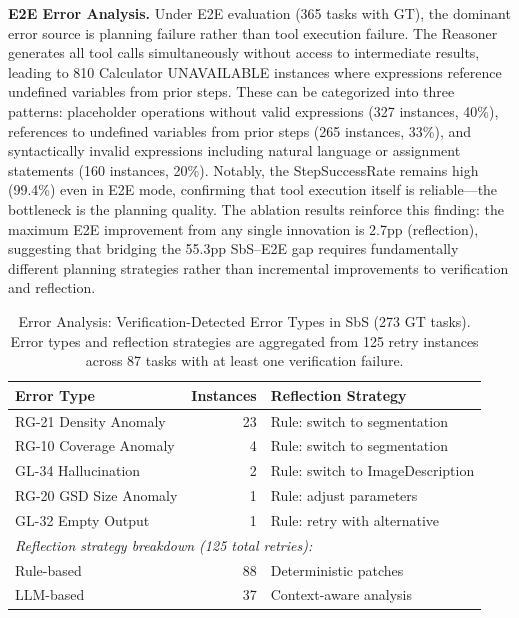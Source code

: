 \documentclass[journal]{IEEEtran}
\begin{document}
\textbf{E2E Error Analysis.}
Under E2E evaluation (365 tasks with GT), the dominant error source is planning failure rather than tool execution failure.
The Reasoner generates all tool calls simultaneously without access to intermediate results, leading to 810 Calculator UNAVAILABLE instances where expressions reference undefined variables from prior steps.
These can be categorized into three patterns: placeholder operations without valid expressions (327 instances, 40\%), references to undefined variables from prior steps (265 instances, 33\%), and syntactically invalid expressions including natural language or assignment statements (160 instances, 20\%).
Notably, the StepSuccessRate remains high (99.4\%) even in E2E mode, confirming that tool execution itself is reliable---the bottleneck is the planning quality.
The ablation results reinforce this finding: the maximum E2E improvement from any single innovation is 2.7pp (reflection), suggesting that bridging the 55.3pp SbS--E2E gap requires fundamentally different planning strategies rather than incremental improvements to verification and reflection.

\begin{table}[t]
\centering
\caption{Error Analysis: Verification-Detected Error Types in SbS (273 GT tasks). Error types and reflection strategies are aggregated from 125 retry instances across 87 tasks with at least one verification failure.}
\label{tab:error_types}
\begin{tabular}{l r l}
\toprule
\textbf{Error Type} & \textbf{Instances} & \textbf{Reflection Strategy} \\
\midrule
RG-21 Density Anomaly & 23 & Rule: switch to segmentation \\
RG-10 Coverage Anomaly & 4 & Rule: switch to segmentation \\
GL-34 Hallucination & 2 & Rule: switch to ImageDescription \\
RG-20 GSD Size Anomaly & 1 & Rule: adjust parameters \\
GL-32 Empty Output & 1 & Rule: retry with alternative \\
\midrule
\multicolumn{3}{l}{\textit{Reflection strategy breakdown (125 total retries):}} \\
Rule-based & 88 & Deterministic patches \\
LLM-based & 37 & Context-aware analysis \\
\bottomrule
\end{tabular}
\end{table}
\end{document}
